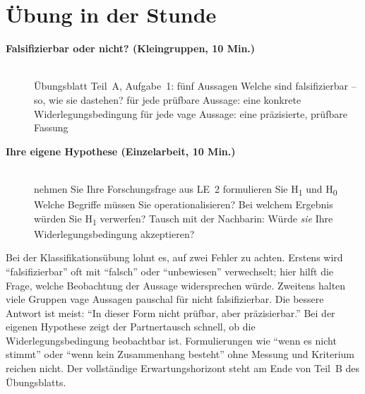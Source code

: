 \section{Übung in der Stunde}
\begin{description}
\item[{\rot\bf Falsifizierbar oder nicht? (Kleingruppen, 10 Min.)}]~\\[-\lblskip]
\bi
  \ite Übungsblatt Teil~A, Aufgabe~1: fünf Aussagen
  \ite Welche sind falsifizierbar -- so, wie sie dastehen?
  \ite für jede prüfbare Aussage: eine konkrete Widerlegungsbedingung
  \ite für jede vage Aussage: eine präzisierte, prüfbare Fassung
\ei
\os{\newpage}

\item[{\rot\bf Ihre eigene Hypothese (Einzelarbeit, 10 Min.)}]~\\[-\lblskip]
\bi
  \ite nehmen Sie Ihre Forschungsfrage aus LE~2
  \ite formulieren Sie H\textsubscript{1} und H\textsubscript{0}
  \ite Welche Begriffe müssen Sie operationalisieren?
  \ite Bei welchem Ergebnis würden Sie H\textsubscript{1} verwerfen?
  \ite Tausch mit der Nachbarin: Würde \emph{sie} Ihre
    Widerlegungsbedingung akzeptieren?
\ei
\os{\newpage}
\end{description}

\begin{lehrhinweis}
Bei der Klassifikationsübung lohnt es, auf zwei Fehler zu achten.
Erstens wird \enquote{falsifizierbar} oft mit \enquote{falsch} oder
\enquote{unbewiesen} verwechselt; hier hilft die Frage, welche Beobachtung
der Aussage widersprechen würde. Zweitens halten viele Gruppen vage
Aussagen pauschal für nicht falsifizierbar. Die bessere Antwort ist meist:
\enquote{In dieser Form nicht prüfbar, aber präzisierbar.} Bei der eigenen
Hypothese zeigt der Partnertausch schnell, ob die Widerlegungsbedingung
beobachtbar ist. Formulierungen wie \enquote{wenn es nicht stimmt} oder
\enquote{wenn kein Zusammenhang besteht} ohne Messung und Kriterium reichen
nicht. Der vollständige Erwartungshorizont steht am Ende von Teil~B des
Übungsblatts.
\end{lehrhinweis}

